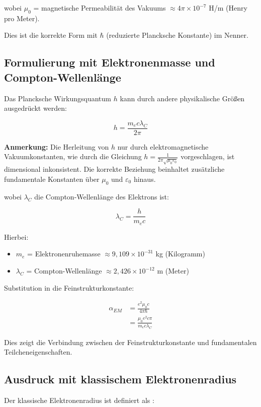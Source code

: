 \documentclass[12pt,a4paper]{article}
\begin{document}
	wobei $\mu_0$ = magnetische Permeabilität des Vakuums $\approx 4\pi \times 10^{-7}$ H/m (Henry pro Meter).
	
	Dies ist die korrekte Form mit $\hbar$ (reduzierte Plancksche Konstante) im Nenner.
	
	\subsection{Formulierung mit Elektronenmasse und Compton-Wellenlänge}
	Das Plancksche Wirkungsquantum $h$ kann durch andere physikalische Größen ausgedrückt werden:
	
	\begin{equation}
		h = \frac{m_e c \lambda_C}{2\pi}
	\end{equation}
	
	\textbf{Anmerkung:} Die Herleitung von $h$ nur durch elektromagnetische Vakuumkonstanten, wie durch die Gleichung $h = \frac{1}{2\pi\sqrt{\mu_0\varepsilon_0}}$ vorgeschlagen, ist dimensional inkonsistent. Die korrekte Beziehung beinhaltet zusätzliche fundamentale Konstanten über $\mu_0$ und $\varepsilon_0$ hinaus.
	
	wobei $\lambda_C$ die Compton-Wellenlänge des Elektrons ist:
	
	\begin{equation}
		\lambda_C = \frac{h}{m_e c}
	\end{equation}
	
	Hierbei:
	\begin{itemize}
		\item $m_e$ = Elektronenruhemasse $\approx 9,109 \times 10^{-31}$ kg (Kilogramm)
		\item $\lambda_C$ = Compton-Wellenlänge $\approx 2,426 \times 10^{-12}$ m (Meter)
	\end{itemize}
	
	Substitution in die Feinstrukturkonstante:
	
	\begin{align}
		\alpha_{EM} &= \frac{e^2\mu_0 c}{4\pi\hbar}\\
		&= \frac{\mu_0e^2 c \pi}{m_e c \lambda_C}
	\end{align}
	
	Dies zeigt die Verbindung zwischen der Feinstrukturkonstante und fundamentalen Teilcheneigenschaften.
	
	\subsection{Ausdruck mit klassischem Elektronenradius}
	Der klassische Elektronenradius ist definiert als \cite{Born2013}:
	
\end{document}
